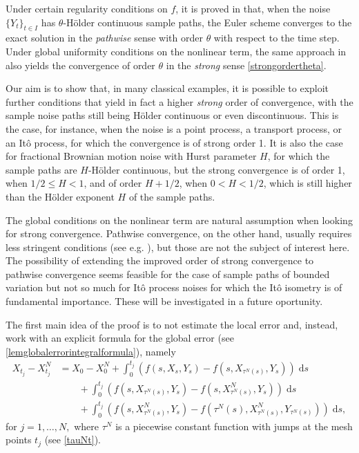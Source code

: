 \documentclass[reqno,12pt]{amsart}
\theoremstyle{plain} %
\theoremstyle{definition} %
\begin{document}
Under certain regularity conditions on $f$, it is proved in \cite{GruneKloeden2001} that, when the noise $\{Y_t\}_{t\in I}$ has $\theta$-H\"older continuous sample paths, the Euler scheme converges to the exact solution in the \emph{pathwise} sense with order $\theta$ with respect to the time step. Under global uniformity conditions on the nonlinear term, the same approach in \cite{GruneKloeden2001} also yields the convergence of order $\theta$ in the \emph{strong} sense \eqref{strongordertheta}.

Our aim is to show that, in many classical examples, it is possible to exploit further conditions that yield in fact a higher \emph{strong} order of convergence, with the sample noise paths still being H\"older continuous or even discontinuous. This is the case, for instance, when the noise is a point process, a transport process, or an It\^o process, for which the convergence is of strong order 1. It is also the case for fractional Brownian motion noise with Hurst parameter $H$, for which the sample paths are $H$-H\"older continuous, but the strong convergence is of order 1, when $1/2 \leq H < 1$, and of order $H + 1/2$, when $0 < H < 1/2$, which is still higher than the H\"older exponent $H$ of the sample paths.

The global conditions on the nonlinear term are natural assumption when looking for strong convergence. Pathwise convergence, on the other hand, usually requires less stringent conditions (see e.g. \cite{JentzenKloedenNeuenkirch2009, JentzenKloeden2011}), but those are not the subject of interest here. The possibility of extending the improved order of strong convergence to pathwise convergence seems feasible for the case of sample paths of bounded variation but not so much for It\^o process noises for which the It\^o isometry is of fundamental importance. These will be investigated in a future oportunity.

The first main idea of the proof is to not estimate the local error and, instead, work with an explicit formula for the global error (see \cref{lemglobalerrorintegralformula}), namely
\begin{equation}
    \label{lemglobalerrorintegralformulaintro}
    \begin{aligned}
        X_{t_j} - X_{t_j}^N & = X_0 - X_0^N + \int_0^{t_j} \left( f(s, X_s, Y_s) - f(s, X_{\tau^N(s)}, Y_s) \right)\;\mathrm{d}s  \\ 
        & \qquad + \int_{0}^{t_j} \left( f(s, X_{\tau^N(s)}, Y_s) - f(s, X_{\tau^N(s)}^N, Y_s) \right)\;\mathrm{d}s \\
        & \qquad + \int_0^{t_j} \left( f(s, X_{\tau^N(s)}^N, Y_s) - f(\tau^N(s), X_{\tau^N(s)}^N, Y_{\tau^N(s)}) \right)\;\mathrm{d}s,
    \end{aligned}
\end{equation}
for $j = 1, \ldots, N,$ where $\tau^N$ is a piecewise constant function with jumps at the mesh points $t_j$ (see \eqref{tauNt}).
\end{document}
